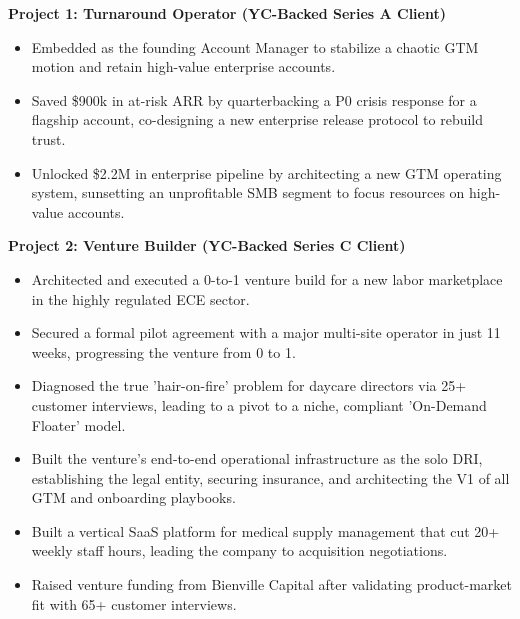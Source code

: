 \documentclass[10pt,a4paper,withhyper]{altacv}
\begin{document}



\makecvheader



\textbf{Project 1: Turnaround Operator (YC-Backed Series A Client)}
\begin{itemize}
\item Embedded as the founding Account Manager to stabilize a chaotic GTM motion and retain high-value enterprise accounts.
\item Saved \$900k in at-risk ARR by quarterbacking a P0 crisis response for a flagship account, co-designing a new enterprise release protocol to rebuild trust.
\item Unlocked \$2.2M in enterprise pipeline by architecting a new GTM operating system, sunsetting an unprofitable SMB segment to focus resources on high-value accounts.
\end{itemize}

\textbf{Project 2: Venture Builder (YC-Backed Series C Client)}
\begin{itemize}
\item Architected and executed a 0-to-1 venture build for a new labor marketplace in the highly regulated ECE sector.
\item Secured a formal pilot agreement with a major multi-site operator in just 11 weeks, progressing the venture from 0 to 1.
\item Diagnosed the true 'hair-on-fire' problem for daycare directors via 25+ customer interviews, leading to a pivot to a niche, compliant 'On-Demand Floater' model.
\item Built the venture's end-to-end operational infrastructure as the solo DRI, establishing the legal entity, securing insurance, and architecting the V1 of all GTM and onboarding playbooks.
\end{itemize}

\begin{itemize}
\item Built a vertical SaaS platform for medical supply management that cut 20+ weekly staff hours, leading the company to acquisition negotiations.
\item Raised venture funding from Bienville Capital after validating product-market fit with 65+ customer interviews.
\end{itemize}
\end{document}
